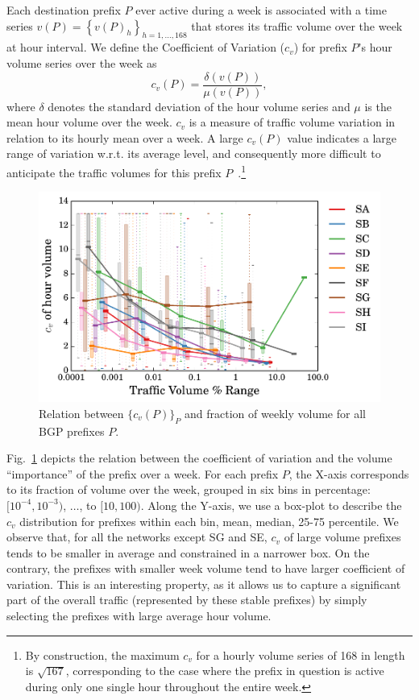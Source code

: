 Each destination prefix $P$ ever active during a week is associated with a time series $v(P)={\left\{ v(P)_h\right\} }_{h=1, \dots, 168}$ that
stores its traffic volume over the week at hour interval. 
We define the Coefficient of Variation ($c_v$) for prefix $P$'s hour volume series over the week as
\begin{equation*}
c_v(P) = \frac{\delta(v(P))}{\mu(v(P))},
\label{eq:cv}
\end{equation*}
where $\delta$ denotes the standard deviation of the hour volume series and $\mu$ is the mean hour volume over the week.
$c_v$ is a measure of traffic volume variation in relation to its hourly mean over a week.
A large $c_v(P)$ value indicates a large range of variation w.r.t. its average level, and consequently more difficult to anticipate the traffic volumes for this prefix $P$~\cite{He2005}.\footnote{By construction, the maximum $c_v$ for a hourly volume series of 168 in length is $\sqrt{167}$, corresponding to the case where the prefix in question is active during only one single hour throughout the entire week.}

\begin{figure}[!htb]
\centering
\includegraphics[width=1\textwidth]{gfx/chap2/cv_bin.pdf}
\caption{Relation between $\{c_v(P)\}_P$  and  fraction of weekly volume for all BGP prefixes $P$. 
}
\label{fig:cv}
\end{figure}

Fig.~\ref{fig:cv} depicts the relation between the coefficient of variation and the volume ``importance'' of the prefix over a week. For each prefix $P$,  the X-axis corresponds to its fraction of volume over the week, grouped in six bins in percentage: $[10^{-4}, 10^{-3})$, $\dots$, to $[10,100)$. Along the Y-axis, we use a  box-plot to describe the $c_v$ distribution for prefixes within each bin, mean, median, 25-75 percentile.
We observe that, for all the networks except SG and SE, $c_v$ of large volume prefixes tends to be smaller in average and constrained in a narrower box. On the contrary, the prefixes with smaller week volume tend to have larger coefficient of variation. 
This is an interesting property, as it allows us to capture a significant part of the overall traffic (represented by these stable prefixes) by simply selecting the prefixes with large average hour volume. 


